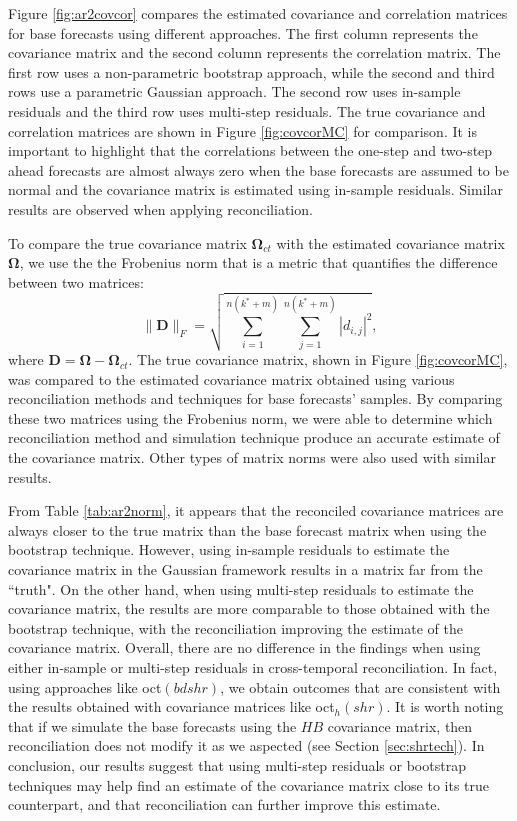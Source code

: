 \documentclass[a4paper,11pt]{article}
\newcommand{\Dvet}{\bm{D}}
\newcommand{\Omegavet}{\bm{\Omega}}
\theoremstyle{definition}
\begin{document}
Figure \ref{fig:ar2covcor} compares the estimated covariance and correlation matrices for base forecasts using different approaches. The first column represents the covariance matrix and the second column represents the correlation matrix. The first row uses a non-parametric bootstrap approach, while the second and third rows use a parametric Gaussian approach. The second row uses in-sample residuals and the third row uses multi-step residuals. The true covariance and correlation matrices are shown in Figure \ref{fig:covcorMC} for comparison. It is important to highlight that the correlations between the one-step and two-step ahead forecasts are almost always zero when the base forecasts are assumed to be normal and the covariance matrix is estimated using in-sample residuals. Similar results are observed when applying reconciliation.

To compare the true covariance matrix $\Omegavet_{ct}$ with the estimated covariance matrix $\Omegavet$, we use the the Frobenius norm that is a metric that quantifies the difference between two matrices:
$$
\lVert \Dvet \rVert_F = \sqrt{\sum_{i = 1}^{n(k^\ast + m)}\sum_{j = 1}^{n(k^\ast + m)}|d_{i,j}|^2},
$$ 
where $\Dvet = \Omegavet - \Omegavet_{ct}$. The true covariance matrix, shown in Figure \ref{fig:covcorMC}, was compared to the estimated covariance matrix obtained using various reconciliation methods and techniques for base forecasts' samples. By comparing these two matrices using the Frobenius norm, we were able to determine which reconciliation method and simulation technique produce an accurate estimate of the covariance matrix. Other types of matrix norms were also used with similar results. 

From Table \ref{tab:ar2norm}, it appears that the reconciled covariance matrices are always closer to the true matrix than the base forecast matrix when using the bootstrap technique. However, using in-sample residuals to estimate the covariance matrix in the Gaussian framework results in a matrix far from the “truth". On the other hand, when using multi-step residuals to estimate the covariance matrix, the results are more comparable to those obtained with the bootstrap technique, with the reconciliation improving the estimate of the covariance matrix. Overall, there are no difference in the findings when using either in-sample or multi-step residuals in cross-temporal reconciliation. In fact, using approaches like oct$(bdshr)$, we obtain outcomes that are consistent with the results obtained with covariance matrices like oct$_h(shr)$. It is worth noting that if we simulate the base forecasts using the $HB$ covariance matrix, then reconciliation does not modify it as we aspected (see Section \ref{sec:shrtech}). In conclusion, our results suggest that using multi-step residuals or bootstrap techniques may help find an estimate of the covariance matrix close to its true counterpart, and that reconciliation can further improve this estimate.
\end{document}
